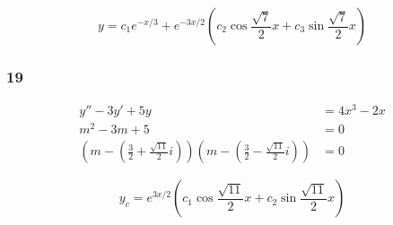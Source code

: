 \documentclass{article}
\begin{document}
\[y = c_1 e^{-x / 3} + e^{-3 x / 2} \left( c_2 \cos \frac{\sqrt{7}}{2} x + c_3 \sin \frac{\sqrt{7}}{2} x \right)\]

\subsubsection{19}

\begin{align*}
  y'' - 3 y' + 5 y                                                                                                                            & = 4 x^3 - 2 x \\
  m^2 - 3 m + 5                                                                                                                               & = 0           \\
  \left( m - \left( \frac{3}{2} + \frac{\sqrt{11}}{2} i \right) \right) \left( m - \left( \frac{3}{2} - \frac{\sqrt{11}}{2} i \right) \right) & = 0
\end{align*}

\[y_c = e^{3 x / 2} \left( c_1 \cos \frac{\sqrt{11}}{2} x + c_2 \sin \frac{\sqrt{11}}{2} x \right)\]
\end{document}

